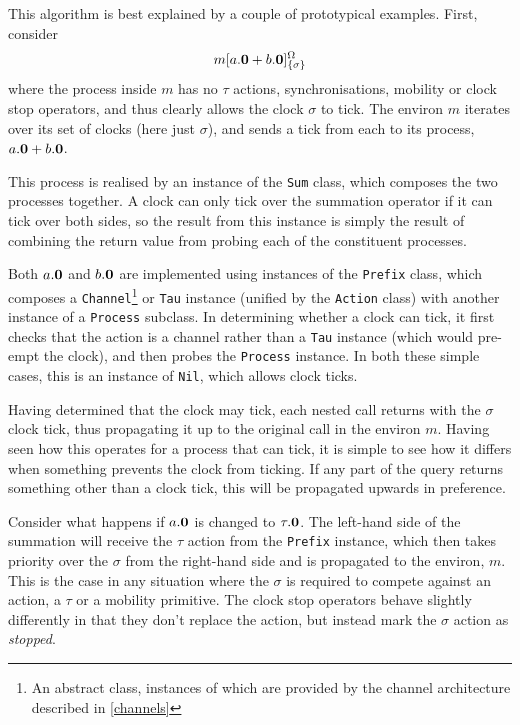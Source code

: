 \documentclass{acm_proc_article-sp}
\begin{document}
This algorithm is best explained by a couple of prototypical examples.
First, consider 
\begin{displaymath}
{m}[ a.\textbf{0} + b.\textbf{0} ]^{\Omega}_{\{\sigma\}}
\end{displaymath}
where the process inside $m$ has no $\tau$ actions, synchronisations,
mobility or clock stop operators, and thus clearly allows the clock
$\sigma$ to tick.  The environ $m$ iterates over its set of clocks (here
just $\sigma$), and sends a tick from each to its process, $a.\textbf{0} +
b.\textbf{0}$.

This process is realised by an instance of the \texttt{Sum} class, which
composes the two processes together.  A clock can only tick over the
summation operator if it can tick over both sides, so the result from
this instance is simply the result of combining the return value from
probing each of the constituent processes.

Both $a.\textbf{0}$ and $b.\textbf{0}$ are implemented using instances of the
\texttt{Prefix} class, which composes a \texttt{Channel}\footnote{An
abstract class, instances of which are provided by the channel
architecture described in \ref{channels}} or \texttt{Tau} instance
(unified by the \texttt{Action} class) with another instance of a
\texttt{Process} subclass.  In determining whether a clock can tick, it
first checks that the action is a channel rather than a \texttt{Tau}
instance (which would pre-empt the clock), and then probes the
\texttt{Process} instance.  In both these simple cases, this is an
instance of \texttt{Nil}, which allows clock ticks.

Having determined that the clock may tick, each nested call returns with
the $\sigma$ clock tick, thus propagating it up to the original call in
the environ $m$.  Having seen how this operates for a process that can
tick, it is simple to see how it differs when something prevents the
clock from ticking.  If any part of the query returns something other
than a clock tick, this will be propagated upwards in preference.

Consider what happens if $a.\textbf{0}$ is changed to $\tau.\textbf{0}$.  The
left-hand side of the summation will receive the $\tau$ action from the
\texttt{Prefix} instance, which then takes priority over the $\sigma$
from the right-hand side and is propagated to the environ, $m$.  This is
the case in any situation where the $\sigma$ is required to compete
against an action, a $\tau$ or a mobility primitive.  The clock stop
operators behave slightly differently in that they don't replace the
action, but instead mark the $\sigma$ action as \emph{stopped}.
\end{document}
